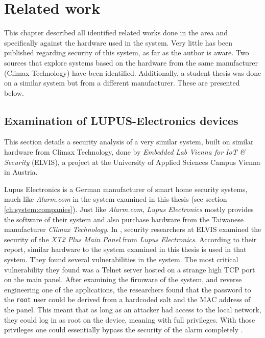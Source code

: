 \chapter{Related work} \label{ch:related-work}
This chapter described all identified related works done in the area and specifically against the hardware used in the system. Very little has been published regarding security of this system, as far as the author is aware. Two sources that explore systems based on the hardware from the same manufacturer (Climax Technology) have been identified. Additionally, a student thesis was done on a similar system but from a different manufacturer. These are presented below.

\section{Examination of LUPUS-Electronics devices}
This section details a security analysis of a very similar system, built on similar hardware from Climax Technology, done by \textit{Embedded Lab Vienna for IoT \& Security} (ELVIS), a project at the University of Applied Sciences Campus Vienna in Austria.

Lupus Electronics is a German manufacturer of smart home security systems, much like \textit{Alarm.com} in the system examined in this thesis (see section \ref{ch:system:companies}). Just like \textit{Alarm.com}, \textit{Lupus Electronics} mostly provides the software of their system and also purchase hardware from the Taiwanese manufacturer \textit{Climax Technology}. In \citeyear{labvienna}, security researchers at ELVIS examined the security of the \textit{XT2 Plus Main Panel} from \textit{Lupus Electronics}. According to their report, similar hardware to the system examined in this thesis is used in that system. They found several vulnerabilities in the system. The most critical vulnerability they found was a Telnet server hosted on a strange high TCP port on the main panel. After examining the firmware of the system, and reverse engineering one of the applications, the researchers found that the password to the \texttt{root} user could be derived from a hardcoded salt and the MAC address of the panel. This meant that as long as an attacker had access to the local network, they could log in as root on the device, meaning with full privileges. With those privileges one could essentially bypass the security of the alarm completely \citeyear{labvienna}.


